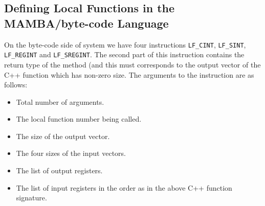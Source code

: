 \subsection{Defining Local Functions in the MAMBA/byte-code Language} 
On the byte-code side of system we have four instructions
\verb|LF_CINT|, \verb|LF_SINT|, \verb|LF_REGINT| and \verb|LF_SREGINT|.
The second part of this instruction contains the return type
of the method (and this must corresponds to the output vector
of the C++ function which has non-zero size.
The arguments to the instruction are as follows:
\begin{itemize}
\item Total number of arguments.
\item The local function number being called.
\item The size of the output vector.
\item The four sizes of the input vectors.
\item The list of output registers.
\item The list of input registers in the order as in the
above C++ function signature.
\end{itemize}

